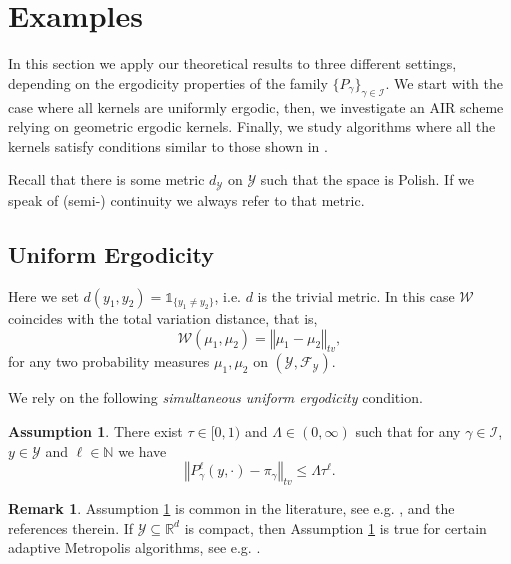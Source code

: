 \documentclass[12pt]{article}
\theoremstyle{definition}
\newtheorem{rem}[thm]{Remark}
\newtheorem{ass}[thm]{Assumption}
\newcommand{\norm}[1]{\left\Vert #1 \right\Vert}
\newcommand{\N}{\mathbb{N}}
\newcommand{\R}{\mathbb{R}}
\newcommand{\cY}{\mathcal{Y}}
\begin{document}
\section{Examples}\label{sec:examples}

In this section we apply our theoretical results to three different settings, depending on the ergodicity properties of the family $\{ P_\gamma\}_{\gamma \in \mathcal{I}}$.
We start with the case where all kernels are uniformly ergodic,
then, we investigate an AIR scheme relying on geometric ergodic kernels.
Finally, we study algorithms where all the kernels satisfy conditions similar to those shown in \cite{hairer2011asymptotic}. 

Recall that there is some metric $d_\cY$ on $\cY$ such that the space is Polish. 
	If we speak of (semi-) continuity we always refer to that metric. 
\subsection{Uniform Ergodicity}
Here we set $d(y_1,y_2) = \mathds{1}_{\{y_1 \neq y_2\}}$, i.e. $d$ is the trivial metric.
In this case $\mathcal{W}$ coincides with the total variation distance, that is,
\[
\mathcal{W}(\mu_1, \mu_2) = \norm{\mu_1 - \mu_2}_{tv},
\]
for any two probability measures $\mu_1, \mu_2$ on $(\cY, \mathcal{F}_\cY)$.


We rely on the following
\textit{simultaneous uniform ergodicity} condition.

\begin{ass}\label{ass:uniform_ergodicity}
	There exist $\tau \in [0,1)$ and $\Lambda \in (0, \infty)$ such that for any $\gamma \in \mathcal{I}$, $y \in \cY$ and $\ell \in \N$ we have 
	\[
	\norm{P_\gamma^\ell (y, \cdot) - \pi_\gamma}_{tv} \leq \Lambda \tau^\ell. 
	\]
\end{ass} 

\begin{rem}
	Assumption \ref{ass:uniform_ergodicity} is common in the literature, see e.g. \cite{roberts2007coupling,laitinen2024invitationadaptivemarkovchain}, and the references therein. If $\cY\subseteq \R^d$ is compact, then Assumption \ref{ass:uniform_ergodicity} is true for certain adaptive Metropolis algorithms, see e.g. \cite[Section 5]{laitinen2024invitationadaptivemarkovchain}.
\end{rem}
\end{document}
